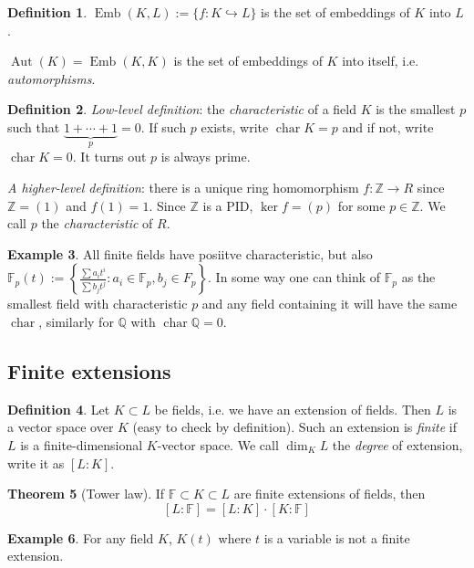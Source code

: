 \documentclass{article}
\newcommand{\F}{\mathbb{F}}
\newcommand{\Z}{\mathbb{Z}}
\newcommand{\Q}{\mathbb{Q}}
\newcommand{\Char}{\operatorname{char}}
\newcommand{\Aut}{\operatorname{Aut}}
\newcommand{\Emb}{\operatorname{Emb}}
\theoremstyle{definition}
\newtheorem{defn}{Definition}[subsection]
\newtheorem{thm}[defn]{Theorem}
\newtheorem{example}[defn]{Example}
\begin{document}
\begin{defn}
$\Emb(K,L):=\{f:K\hookrightarrow L\}$ is the set of embeddings of $K$ into $L$.

$\Aut(K)=\Emb(K,K)$ is the set of embeddings of $K$ into itself, i.e. \textit{automorphisms}.
\end{defn}
\begin{defn}
\textit{Low-level definition}: the \textit{characteristic} of a field $K$ is the smallest $p$ such that $\underbrace{1+\cdots+1}_p=0$. If such $p$ exists, write $\Char K=p$ and if not, write $\Char K=0$. It turns out $p$ is always prime.

\textit{A higher-level definition}: there is a unique ring homomorphism $f:\Z\rightarrow R$ since $\Z=(1)$ and $f(1)=1$. Since $\Z$ is a PID, $\ker f=(p)$ for some $p\in\Z$. We call $p$ the \textit{characteristic} of $R$.
\end{defn}
\begin{example}
All finite fields have posiitve characteristic, but also $\F_p(t):=\left\{\frac{\sum a_it^i}{\sum b_jt^j}:a_i\in\F_p,b_j\in F_p\right\}$. In some way one can think of $\F_p$ as the smallest field with characteristic $p$ and any field containing it will have the same $\Char$, similarly for $\Q$ with $\Char\Q=0$.
\end{example}

\subsection{Finite extensions}

\begin{defn}
Let $K\subset L$ be fields, i.e. we have an extension of fields. Then $L$ is a vector space over $K$ (easy to check by definition). Such an extension is \textit{finite} if $L$ is a finite-dimensional $K$-vector space. We call $\dim_K L$ the \textit{degree} of extension, write it as $[L:K]$.
\end{defn}

\begin{thm}[Tower law]
If $\F\subset K\subset L$ are finite extensions of fields, then
\[
[L:\F]=[L:K]\cdot [K:\F]
\]
\end{thm}

\begin{example}
For any field $K$, $K(t)$ where $t$ is a variable is not a finite extension.
\end{example}
\end{document}

